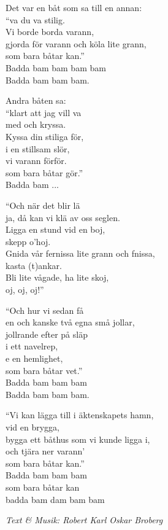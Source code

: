 \vspace{10pt}
Det var en båt som sa till en annan:\\
``va du va stilig.\\
Vi borde borda varann,\\
gjorda för varann och köla lite grann,\\
som bara båtar kan.''\\
Badda bam bam bam bam\\
Badda bam bam bam.\par
\vspace{10pt}
Andra båten sa:\\
``klart att jag vill va\\
med och kryssa.\\
Kyssa din stiliga för,\\
i en stillsam slör,\\
vi varann förför.\\
som bara båtar gör.''\\
Badda bam ...\par
\vspace{10pt}
``Och när det blir lä\\
ja, då kan vi klä av oss seglen.\\
Ligga en stund vid en boj,\\
skepp o'hoj.\\
Gnida vår fernissa lite grann och fnissa,\\
kasta (t)ankar.\\
Bli lite vågade, ha lite skoj,\\
oj, oj, oj!''\par
\newpage
``Och hur vi sedan få\\
en och kanske två egna små jollar,\\
jollrande efter på släp\\
i ett navelrep,\\
e en hemlighet,\\
som bara båtar vet.''\\
Badda bam bam bam\\
Badda bam bam bam.\par
\vspace{10pt}
``Vi kan lägga till i äktenskapets hamn,\\
vid en brygga,\\
bygga ett båthus som vi kunde ligga i,\\
och tjära ner varann'\\
som bara båtar kan.''\\
Badda bam bam bam\\
som bara båtar kan\\
badda bam dam bam bam\par
\vspace{10pt}
{\footnotesize\textit{Text \& Musik: Robert Karl Oskar Broberg}}
